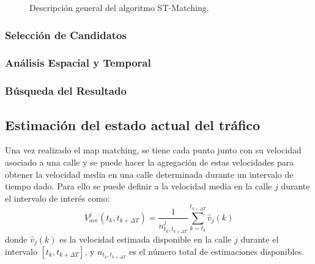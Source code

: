 \begin{figure}[h]
	\centering
	
	\caption[Descripción General de ST-Matching]{Descripción general del algoritmo ST-Matching.}
	\label{fig:st-matching} 
\end{figure}

\subsubsection{Selección de Candidatos}



\subsubsection{Análisis Espacial y Temporal}

\subsubsection{Búsqueda del Resultado}

\subsection{Estimación del estado actual del tráfico}

Una vez realizado el map matching, se tiene cada punto junto con su velocidad asociado a una calle y se puede hacer la agregación de estas velocidades para obtener la velocidad media en una calle determinada durante un intervalo de tiempo dado. Para ello se puede definir a la velocidad media en la calle $j$ durante el intervalo de interés como:
\begin{equation}
{ V }_{ ave }^{ j }({ t }_{ k },{ t }_{ k+\Delta T })=\frac { 1 }{ { n }_{ { t }_{ k },{ t }_{ k+\Delta T } }^{ j } } \sum_{ k={ t }_{ k } }^{ { t }_{ k+\Delta T } }{ \hat { { v } } _{ j }(k) }
\end{equation}
donde ${ \hat { { v } } _{ j }(k) }$ es la velocidad estimada disponible en la calle $j$ durante el intervalo $\left[ { t }_{ k },{ t }_{ k+\Delta T } \right] $, y ${ { n }_{ { t }_{ k },{ t }_{ k+\Delta T }}}$ es el número total de estimaciones disponibles.

